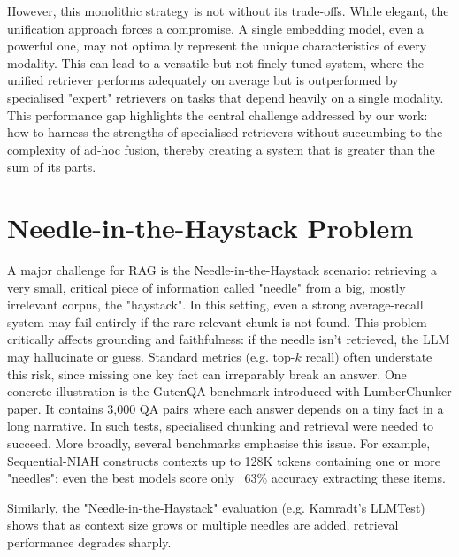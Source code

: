 \documentclass[12pt,twoside]{report}
\begin{document}
However, this monolithic strategy is not without its trade-offs. While elegant, the unification approach forces a compromise. A single embedding model, even a powerful one, may not optimally represent the unique characteristics of every modality. This can lead to a versatile but not finely-tuned system, where the unified retriever performs adequately on average but is outperformed by specialised "expert" retrievers on tasks that depend heavily on a single modality. This performance gap highlights the central challenge addressed by our work: how to harness the strengths of specialised retrievers without succumbing to the complexity of ad-hoc fusion, thereby creating a system that is greater than the sum of its parts.


\section{Needle-in-the-Haystack Problem}
A major challenge for RAG is the Needle-in-the-Haystack scenario: retrieving a very small, critical piece of information called "needle" from a big, mostly irrelevant corpus, the "haystack". In this setting, even a strong average-recall system may fail entirely if the rare relevant chunk is not found. This problem critically affects grounding and faithfulness: if the needle isn't retrieved, the LLM may hallucinate or guess. Standard metrics (e.g. top-$k$ recall) often understate this risk, since missing one key fact can irreparably break an answer.
One concrete illustration is the GutenQA benchmark introduced with LumberChunker\cite{LumberChunker} paper. It contains 3,000 QA pairs where each answer depends on a tiny fact in a long narrative. In such tests, specialised chunking and retrieval were needed to succeed. More broadly, several benchmarks emphasise this issue. For example, Sequential-NIAH\cite{SequentialNIAH} constructs contexts up to 128K tokens containing one or more "needles"; even the best models score only ~63\% accuracy extracting these items.

Similarly, the "Needle-in-the-Haystack" evaluation (e.g. Kamradt's LLMTest\cite{NeedleInHaystackTest}) shows that as context size grows or multiple needles are added, retrieval performance degrades sharply.
\end{document}
